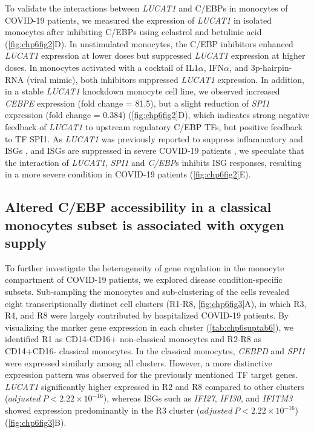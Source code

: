 \documentclass{book}
\begin{document}
\begin{refsection}
To validate the interactions between \textit{LUCAT1} and C/EBPs in monocytes of COVID-19 patients, we measured the expression of \textit{LUCAT1} in isolated monocytes after inhibiting C/EBPs using celastrol and betulinic acid (\ref{fig:chp6fig2}D).
In unstimulated monocytes, the C/EBP inhibitors enhanced \textit{LUCAT1} expression at lower doses but suppressed \textit{LUCAT1} expression at higher doses.
In monocytes activated with a cocktail of IL1$\alpha$, IFN$\alpha$, and 3p-hairpin-RNA (viral mimic), both inhibitors suppressed \textit{LUCAT1} expression.
In addition, in a stable \textit{LUCAT1} knockdown monocyte cell line, we observed increased \textit{CEBPE} expression (fold change = 81.5), but a slight reduction of \textit{SPI1} expression (fold change = 0.384) (\ref{fig:chp6fig2}D), which indicates strong negative feedback of \textit{LUCAT1} to upstream regulatory C/EBP TFs, but positive feedback to TF SPI1.
As \textit{LUCAT1} was previously reported to suppress inflammatory and ISGs \cite{Agarwal2020A}, and ISGs are suppressed in severe COVID-19 patients \cite{Schulte2020Severe}, we speculate that the interaction of \textit{LUCAT1}, \textit{SPI1} and \textit{C/EBP}s inhibits ISG responses, resulting in a more severe condition in COVID-19 patients (\ref{fig:chp6fig2}E).

\subsection*{Altered C/EBP accessibility in a classical monocytes subset is associated with oxygen supply}
To further investigate the heterogeneity of gene regulation in the monocyte compartment of COVID-19 patients, we explored disease condition-specific subsets.
Sub-sampling the monocytes and sub-clustering of the cells revealed eight transcriptionally distinct cell clusters (R1-R8, \ref{fig:chp6fig3}A), in which R3, R4, and R8 were largely contributed by hospitalized COVID-19 patients.
By visualizing the marker gene expression in each cluster (\ref{tab:chp6suptab6}), we identified R1 as CD14-CD16+ non-classical monocytes and R2-R8 as CD14+CD16- classical monocytes.
In the classical monocytes, \textit{CEBPD} and \textit{SPI1} were expressed similarly among all clusters.
However, a more distinctive expression pattern was observed for the previously mentioned TF target genes.
\textit{LUCAT1} significantly higher expressed in R2 and R8 compared to other clusters ($adjusted~P < 2.22 \times 10^{-16}$), whereas ISGs such as \textit{IFI27}, \textit{IFI30}, and \textit{IFITM3} showed expression predominantly in the R3 cluster ($adjusted~P < 2.22 \times 10^{-16}$) (\ref{fig:chp6fig3}B).



\end{refsection}
\end{document}
